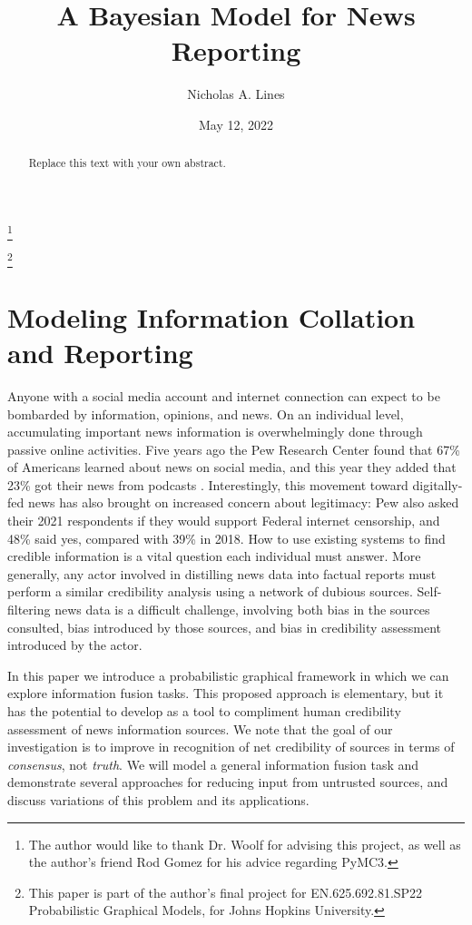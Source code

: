 \documentclass{amsart}
\theoremstyle{plain}
\numberwithin{equation}{section}
\begin{document}
\title[News Reporting]{A Bayesian Model for News Reporting}
\author{Nicholas A. Lines}
\address{}
\thanks{The author would like to thank Dr. Woolf for advising this project,
as well as the author's friend Rod Gomez for his advice regarding PyMC3.}
\date{May 12, 2022}
\thanks{This paper is part of the author's final project for
EN.625.692.81.SP22 Probabilistic Graphical Models, for Johns Hopkins
University.}

\begin{abstract}
Replace this text with your own abstract.
\end{abstract}

\maketitle
\tableofcontents
\listoffigures

\newpage

\section{Modeling Information Collation and Reporting}

Anyone with a social media account and internet connection can expect to be
bombarded by information, opinions, and news. On an individual level,
accumulating important news information is overwhelmingly done through
passive online activities. Five years ago the Pew Research Center found that
67\% of Americans learned about news on social media, and this year they
added that 23\% got their news from podcasts \cite{gottfried2019news}\cite%
{walker2022nearly}. Interestingly, this movement toward digitally-fed news
has also brought on increased concern about legitimacy: Pew also asked their
2021 respondents if they would support Federal internet censorship, and 48\%
said yes, compared with 39\% in 2018. How to use existing systems to find
credible information is a vital question each individual must answer. More
generally, any actor involved in distilling news data into factual reports
must perform a similar credibility analysis using a network of dubious
sources. Self-filtering news data is a difficult challenge, involving both
bias in the sources consulted, bias introduced by those sources, and bias in
credibility assessment introduced by the actor.

In this paper we introduce a probabilistic graphical framework in which we
can explore information fusion tasks. This proposed approach is elementary,
but it has the potential to develop as a tool to compliment human
credibility assessment of news information sources. We note that the goal of
our investigation is to improve in recognition of net credibility of sources
in terms of \emph{consensus}, not \emph{truth}. We will model a general
information fusion task and demonstrate several approaches for reducing
input from untrusted sources, and discuss variations of this problem and its
applications.
\end{document}

